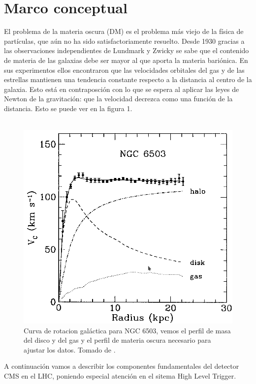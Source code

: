 \section{Marco conceptual}
El problema de la materia oscura (DM) es el problema más viejo de la física de partículas, que aún no ha sido satisfactoriamente resuelto. Desde 1930 gracias a las observaciones independientes de Lundmark y Zwicky \cite{ARTICLE:1,ARTICLE:2} se sabe que el contenido de materia de las galaxias debe ser mayor al que aporta la materia bariónica. En sus experimentos ellos encontraron que las velocidades orbitales del gas y de las estrellas mantienen una tendencia constante respecto a la distancia al centro de la galaxia.
 Esto está en contraposción con lo que se espera al aplicar las leyes de Newton de la gravitación: que la velocidad decrezca como una función de la distancia. Esto se puede ver en la figura 1.
\\
\\
\begin{figure}
\centering
\includegraphics[width=12cm]{F1.png}
\caption{\label{fig:frog} Curva de rotacion galáctica para NGC 6503, vemos el perfil de masa del disco y del gas y el perfil de materia oscura necesario para ajustar los datos. Tomado de \cite{Freese:2017idy}.}
\end{figure}
A continuación vamos a describir los componentes fundamentales del detector CMS en el LHC, poniendo especial atención en el sitema High Level Trigger.


\label{sec:examples}

